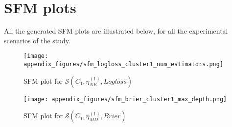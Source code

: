 \chapter{SFM plots}
\label{ape:sfm-plots}

All the generated SFM plots are illustrated below, for all the experimental scenarios of the study.

\singlespacing

\renewcommand{\arraystretch}{0.85}
\captionsetup{margin=1.0cm}  %


\begin{figure}[!ht]
    \centering
    \texttt{[image: appendix\_figures/sfm\_logloss\_cluster1\_num\_estimators.png]}
    \caption{SFM plot for $\mathcal{S}(C_1, \eta^{(1)}_{NE}, Logloss)$}
\end{figure}


\begin{figure}[!ht]
    \centering
    \texttt{[image: appendix\_figures/sfm\_brier\_cluster1\_max\_depth.png]}
    \caption{SFM plot for $\mathcal{S}(C_1, \eta^{(1)}_{MD}, Brier)$}
\end{figure}










